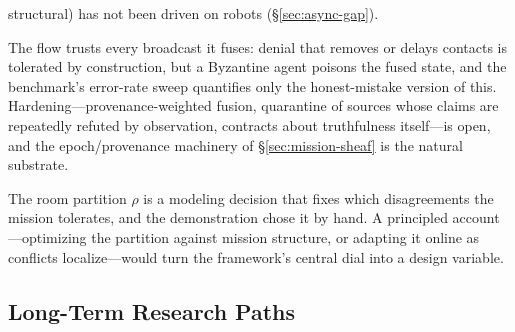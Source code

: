 \documentclass[11pt]{article}
\theoremstyle{definition}
\theoremstyle{remark}
\begin{document}
\begin{description}[leftmargin=1.6em, style=nextline]
structural) has not been driven on robots (\S\ref{sec:async-gap}).
\item[Adversarial fusion.]
The flow trusts every broadcast it fuses: denial that removes or delays contacts is tolerated
by construction, but a Byzantine agent poisons the fused state, and the benchmark's error-rate
sweep quantifies only the honest-mistake version of this.
Hardening---provenance-weighted fusion, quarantine of sources whose claims are repeatedly
refuted by observation, contracts about truthfulness itself---is open, and the epoch/provenance
machinery of \S\ref{sec:mission-sheaf} is the natural substrate.
\item[Choosing the partition.]
The room partition $\rho$ is a modeling decision that fixes which disagreements the mission
tolerates, and the demonstration chose it by hand.
A principled account---optimizing the partition against mission structure, or adapting it
online as conflicts localize---would turn the framework's central dial into a design variable.
\end{description}

\subsection{Long-Term Research Paths}
\label{sec:roadmap-weighted}
\end{document}
